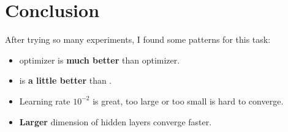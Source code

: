 \chapter{Conclusion}
\indent
	After trying so many experiments, I found some patterns for this task: 
	\begin{itemize}
		\item {} optimizer is \textbf{much better} than  optimizer.
		\item {} is \textbf{a little better} than .
		\item Learning rate $10^{-2}$ is great, too large or too small is hard to converge.
		\item \textbf{Larger} dimension of hidden layers converge faster.
	\end{itemize}